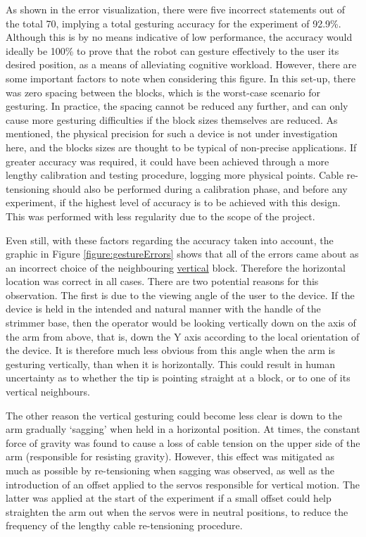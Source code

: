\documentclass[11pt]{article}
\begin{document}
As shown in the error visualization, there were five incorrect statements out of the total 70, implying a total gesturing accuracy for the experiment of 92.9\%. Although this is by no means indicative of low performance, the accuracy would ideally be 100\% to prove that the robot can gesture effectively to the user its desired position, as a means of alleviating cognitive workload. However, there are some important factors to note when considering this figure. In this set-up, there was zero spacing between the blocks, which is the worst-case scenario for gesturing. In practice, the spacing cannot be reduced any further, and can only cause more gesturing difficulties if the block sizes themselves are reduced. As mentioned, the physical precision for such a device is not under investigation here, and the blocks sizes are thought to be typical of non-precise applications. If greater accuracy was required, it could have been achieved through a more lengthy calibration and testing procedure, logging more physical points. Cable re-tensioning should also be performed during a calibration phase, and before any experiment, if the highest level of accuracy is to be achieved with this design. This was performed with less regularity due to the scope of the project.

Even still, with these factors regarding the accuracy taken into account, the graphic in Figure \ref{figure:gestureErrors} shows that all of the errors came about as an incorrect choice of the neighbouring \underline{vertical} block. Therefore the horizontal location was correct in all cases. There are two potential reasons for this observation. The first is due to the viewing angle of the user to the device. If the device is held in the intended and natural manner with the handle of the strimmer base, then the operator would be looking vertically down on the axis of the arm from above, that is, down the Y axis according to the local orientation of the device. It is therefore much less obvious from this angle when the arm is gesturing vertically, than when it is horizontally. This could result in human uncertainty as to whether the tip is pointing straight at a block, or to one of its vertical neighbours. 

The other reason the vertical gesturing could become less clear is down to the arm gradually `sagging' when held in a horizontal position. At times, the constant force of gravity was found to cause a loss of cable tension on the upper side of the arm (responsible for resisting gravity). However, this effect was mitigated as much as possible by re-tensioning when sagging was observed, as well as the introduction of an offset applied to the servos responsible for vertical motion. The latter was applied at the start of the experiment if a small offset could help straighten the arm out when the servos were in neutral positions, to reduce the frequency of the lengthy cable re-tensioning procedure.
\end{document}
